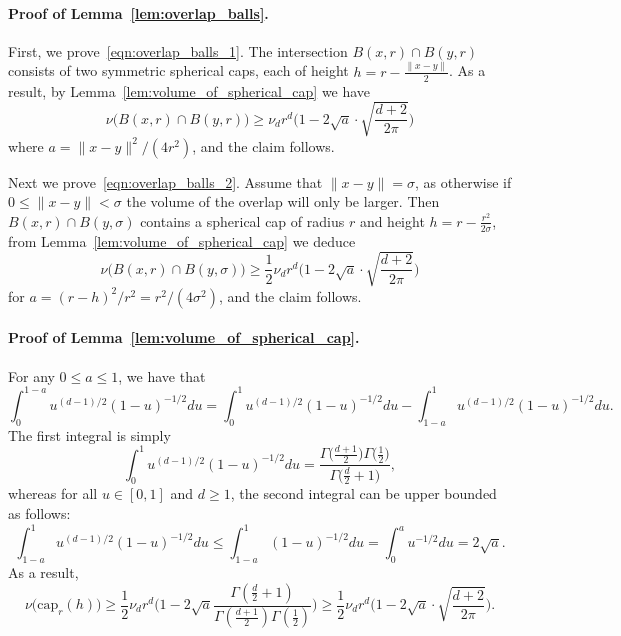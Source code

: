 \paragraph{Proof of Lemma~\ref{lem:overlap_balls}.}
	First, we prove~\eqref{eqn:overlap_balls_1}. The intersection $B(x,r) \cap B(y,r)$ consists of two symmetric spherical caps, each of height $h = r - \frac{\|x - y\|}{2}$. 
	As a result, by Lemma~\ref{lem:volume_of_spherical_cap} we have
	\begin{equation*}
	\nu\bigl(B(x,r) \cap B(y,r)\bigr) \geq \nu_d r^d \bigl(1 - 2\sqrt{a} \cdot \sqrt{\frac{d + 2}{2\pi}}\bigr)
	\end{equation*}
	where $a = \|x - y\|^2/(4r^2)$, and the claim follows.
	
	Next we prove~\eqref{eqn:overlap_balls_2}. Assume that $\|x - y\| = \sigma$, as otherwise if $0 \leq \|x - y\| < \sigma$ the volume of the overlap will only be larger. Then $B(x,r) \cap B(y,\sigma)$ contains a spherical cap of radius $r$ and height $h = r - \frac{r^2}{2\sigma}$, from Lemma~\ref{lem:volume_of_spherical_cap} we deduce
	\begin{equation*}
	\nu\bigl(B(x,r) \cap B(y,\sigma)\bigr) \geq \frac{1}{2}\nu_dr^d\biggl(1 - 2\sqrt{a}\cdot\sqrt{\frac{d + 2}{2\pi}}\biggr)
	\end{equation*}
	for $a = (r - h)^2/r^2 = r^2/(4\sigma^2)$, and the claim follows.

\paragraph{Proof of Lemma~\ref{lem:volume_of_spherical_cap}.}
	For any $0 \leq a \leq 1$, we have that
	\begin{equation*}
	\int_{0}^{1 - a}u^{(d-1)/2}(1 - u)^{-1/2}du = \int_{0}^{1}u^{(d-1)/2}(1 - u)^{-1/2}du - \int_{1 - a}^{1}u^{(d-1)/2}(1 - u)^{-1/2}du. 
	\end{equation*}
	The first integral is simply
	\begin{equation*}
	\int_{0}^{1}u^{(d-1)/2}(1 - u)^{-1/2}du = \frac{\Gamma\bigl(\frac{d + 1}{2}\bigr)\Gamma\bigl(\frac{1}{2}\bigr)}{ \Gamma\bigl(\frac{d}{2}+ 1\bigr)},
	\end{equation*}
	whereas for all $u \in [0,1]$ and $d \geq 1$, the second integral can be upper bounded as follows:
	\begin{equation*}
	\int_{1 - a}^{1}u^{(d-1)/2}(1 - u)^{-1/2}du \leq \int_{1 - a}^{1}(1 - u)^{-1/2}du = \int_{0}^{a} u^{-1/2}du = 2\sqrt{a}.
	\end{equation*}
	As a result, 
	\begin{equation*}
	\nu\bigl(\mathrm{cap}_r(h)\bigr) \geq \frac{1}{2}\nu_dr^d \biggl(1 - 2\sqrt{a}\frac{\Gamma(\frac{d}{2} + 1)}{\Gamma(\frac{d + 1}{2})\Gamma(\frac{1}{2})}\biggr)  \geq \frac{1}{2}\nu_dr^d \biggl(1 - 2\sqrt{a} \cdot \sqrt{\frac{d + 2}{2\pi}}\biggr).
	\end{equation*}


